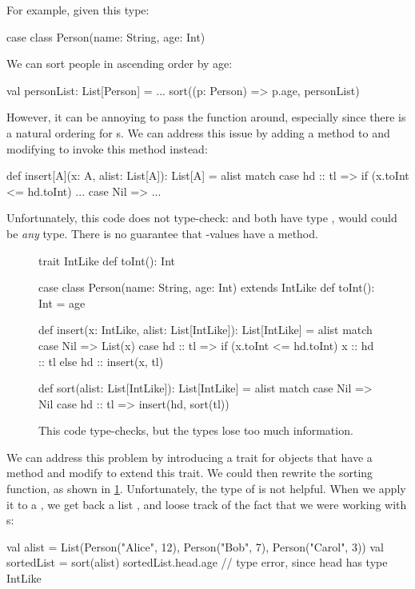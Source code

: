 \documentclass[9pt]{extbook}
\begin{document}
For example, given this type:
\begin{scalacode}
case class Person(name: String, age: Int)
\end{scalacode}
We can sort people in ascending order by age:
\begin{scalacode}
val personList: List[Person] = ...
sort((p: Person) => p.age, personList)
\end{scalacode}

However, it can be annoying to pass the  function around,
especially since there is a natural ordering for s.
We can address this issue by adding a  method
to  and modifying  to invoke this
method instead:
\begin{scalacode}
def insert[A](x: A, alist: List[A]): List[A] = alist match {
  case hd :: tl => if (x.toInt <= hd.toInt) ...
  case Nil => ...
}
\end{scalacode}
Unfortunately, this code does not type-check:  and  both have type ,
would could be \emph{any} type. There is no guarantee that -values have a 
method.

\begin{figure}
\begin{scalacode}
trait IntLike {
  def toInt(): Int
}

case class Person(name: String, age: Int) extends IntLike {
  def toInt(): Int = age
}

def insert(x: IntLike, alist: List[IntLike]): List[IntLike] = alist match {
  case Nil => List(x)
  case hd :: tl => if (x.toInt <= hd.toInt) { x :: hd :: tl } else { hd :: insert(x, tl) }
}

def sort(alist: List[IntLike]): List[IntLike] = alist match {
  case Nil => Nil
  case hd :: tl => insert(hd, sort(tl))
}
\end{scalacode}
\caption{This code type-checks, but the types lose too much information.}
\label{sorting_fail}
\end{figure}

We can address this problem by introducing a trait for objects that have a
 method and modify  to extend this trait.
We could then rewrite the sorting function, as shown in \cref{sorting_fail}.
Unfortunately, the type of  is not helpful. When we apply
it to a , we get back a list ,
and loose track of the fact that we were working with s:
\begin{scalacode}
val alist = List(Person("Alice", 12), Person("Bob", 7), Person("Carol", 3))
val sortedList = sort(alist)
sortedList.head.age // type error, since head has type IntLike
\end{scalacode}
\end{document}
